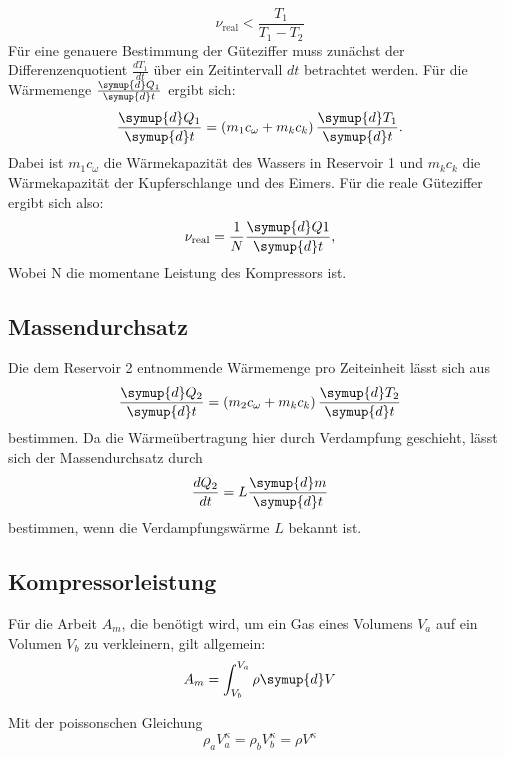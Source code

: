 \begin{equation}
  \nu_\text{real} < \frac{T_1}{T_1-T_2}
\end{equation}
Für eine genauere Bestimmung der Güteziffer muss zunächst der Differenzenquotient $\frac{dT_1}{dt}$ über ein
Zeitintervall $dt$ betrachtet werden.
Für die Wärmemenge $\frac{\symup{d}Q_1}{\symup{d}t}$ ergibt sich:
\begin{equation}
  \frac{\symup{d}Q_1}{\symup{d}t}=\left(m_1 c_\omega + m_k c_k\right)\frac{\symup{d}T_1}{\symup{d}t} .
\end{equation}
Dabei ist $m_1 c_\omega$ die Wärmekapazität des Wassers in Reservoir 1 und $m_k c_k$ die Wärmekapazität der Kupferschlange und
des Eimers.
Für die reale Güteziffer \nu ergibt sich also:
\begin{equation}
  \nu_\text{real}= \frac{1}{N} \frac{\symup{d}Q1}{\symup{d}t},
  \label{eqn:gut}
\end{equation}
Wobei N die momentane Leistung des Kompressors ist.

\subsection{Massendurchsatz}
 Die dem Reservoir 2 entnommende Wärmemenge pro Zeiteinheit lässt sich aus
 \begin{equation}
   \frac{\symup{d}Q_2}{\symup{d}t}=\left(m_2 c_\omega + m_k c_k\right)\frac{\symup{d}T_2}{\symup{d}t}
 \end{equation}
 bestimmen.
 Da die Wärmeübertragung hier durch Verdampfung geschieht, lässt sich der Massendurchsatz durch
 \begin{equation}
   \frac{dQ_2}{dt}=L\frac{\symup{d}m}{\symup{d}t}
   \label{eqn:masse}
 \end{equation}
 bestimmen, wenn die Verdampfungswärme $L$ bekannt ist.

 \subsection{Kompressorleistung}
Für die Arbeit $A_m$, die benötigt wird, um ein Gas eines Volumens $V_a$ auf ein Volumen $V_b$ zu verkleinern, gilt allgemein:
 \begin{equation}
   A_m=\displaystyle\int_{V_b}^{V_a} \rho \symup{d} V
 \end{equation}

Mit der poissonschen Gleichung
\begin{equation}
\rho_a V_a^\kappa=\rho_b V_b^\kappa=\rho V^\kappa
\end{equation}

